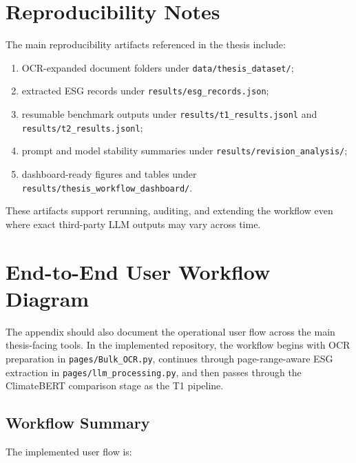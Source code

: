 \documentclass[12pt,a4paper]{report}
\providecommand{\tightlist}{\setlength{\itemsep}{0pt}\setlength{\parskip}{0pt}}
\begin{document}
\section{Reproducibility Notes}\label{reproducibility-notes}

The main reproducibility artifacts referenced in the thesis include:

\begin{enumerate}
\def\labelenumi{\arabic{enumi}.}
\tightlist
\item
  OCR-expanded document folders under \texttt{data/thesis\_dataset/};
\item
  extracted ESG records under \texttt{results/esg\_records.json};
\item
  resumable benchmark outputs under \texttt{results/t1\_results.jsonl} and \texttt{results/t2\_results.jsonl};
\item
  prompt and model stability summaries under \texttt{results/revision\_analysis/};
\item
  dashboard-ready figures and tables under \texttt{results/thesis\_workflow\_dashboard/}.
\end{enumerate}

These artifacts support rerunning, auditing, and extending the workflow even where exact third-party LLM outputs may vary across time.

\section{End-to-End User Workflow Diagram}\label{end-to-end-user-workflow-diagram}

The appendix should also document the operational user flow across the main thesis-facing tools. In the implemented repository, the workflow begins with OCR preparation in \texttt{pages/Bulk\_OCR.py}, continues through page-range-aware ESG extraction in \texttt{pages/llm\_processing.py}, and then passes through the ClimateBERT comparison stage as the T1 pipeline.

\subsection{Workflow Summary}\label{workflow-summary}

The implemented user flow is:
\end{document}

